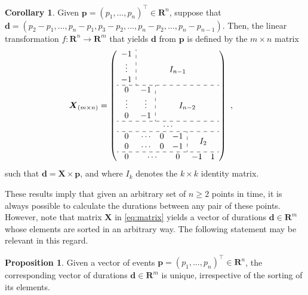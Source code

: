 \documentclass[12pt,oneside,a4paper]{article} %
\theoremstyle{definition}
\newtheorem{proposition}{Proposition}[section]
\newtheorem{corollary}{Corollary}[proposition]
\begin{document}
\begin{corollary}
 Given $\boldsymbol{p}=(p_1,\ldots,p_n)^\top\in\mathbf{R}^n$, suppose that $\boldsymbol{d}=(p_2-p_1,\dots,p_n-p_1,p_3-p_2,\dots,p_n-p_2,\dots,p_n-p_{n-1})$. Then, the linear transformation $f:\mathbf{R}^n\to\mathbf{R}^m$ that yields $\boldsymbol{d}$ from $\boldsymbol{p}$ is defined by the $m\times n$ matrix
 \begin{align}
  \boldsymbol{X}_{(m\times n)}&= \left(\begin{array}{cccccc}
			  \multicolumn{1}{c:}{-1}			& \multicolumn{5}{c}{}					\\
			  \multicolumn{1}{c:}{\vdots}	 		& \multicolumn{5}{c}{I_{n-1}}	 			\\  
			  \multicolumn{1}{c:}{-1}			& \multicolumn{5}{c}{}					\\ \hdashline
			  0		& \multicolumn{1}{c:}{-1}	& \multicolumn{4}{c}{}					\\	 
			  \vdots	& \multicolumn{1}{c:}{\vdots}	& \multicolumn{4}{c}{I_{n-2}}  				\\
			  0		& \multicolumn{1}{c:}{-1}	& \multicolumn{4}{c}{}					\\ \hdashline
			  \multicolumn{6}{c}{\cdots}										\\ \hdashline
			  0		& \cdots	& 0		& \multicolumn{1}{c:}{-1}	& 	& 		\\ 
			  0		& \cdots	& 0		& \multicolumn{1}{c:}{-1}	& \multicolumn{2}{c}{\smash{\raisebox{.5\normalbaselineskip}{$I_2$}}}	\\ \hdashline
			  0		& \multicolumn{2}{c}{\cdots}	& 0				& -1	& 1		\\
			\end{array}\right)
  \label{eq:matrix}\ ,
 \end{align}
 such that $\boldsymbol{d}=\boldsymbol{X}\times\boldsymbol{p}$, and where $I_k$ denotes the $k\times k$ identity matrix.
\end{corollary}

These results imply that given an arbitrary set of $n\geq2$ points in time, it
is always possible to calculate the durations between any pair of these points. However, note that matrix $\boldsymbol{X}$ in \eqref{eq:matrix} yields a vector of durations $\boldsymbol{d}\in\mathbf{R}^m$ whose elements are sorted in an arbitrary way. The following statement may be relevant in this regard.

\begin{proposition}
 Given a vector of events $\boldsymbol{p}=(p_1,\ldots,p_n)^\top\in\mathbf{R}^n$, the corresponding vector of durations $\boldsymbol{d}\in\mathbf{R}^m$ is unique, irrespective of the sorting of its elements.
\end{proposition}
\end{document}
